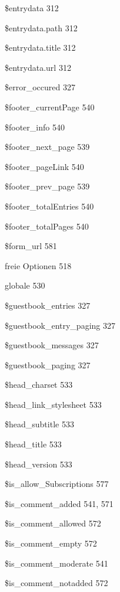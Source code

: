 \documentclass{book}
\renewcommand\subitem{\par}
\begin{document}
\begin{multicols}{2}
\begin{osp-index}
    \subitem \$entrydata\hspace{1mm} 312
    \subitem \$entrydata.path\hspace{1mm} 312
    \subitem \$entrydata.title\hspace{1mm} 312
    \subitem \$entrydata.url\hspace{1mm} 312
    \subitem \$error\_occured\hspace{1mm} 327
    \subitem \$footer\_currentPage\hspace{1mm} 540
    \subitem \$footer\_info\hspace{1mm} 540
    \subitem \$footer\_next\_page\hspace{1mm} 539
    \subitem \$footer\_pageLink\hspace{1mm} 540
    \subitem \$footer\_prev\_page\hspace{1mm} 539
    \subitem \$footer\_totalEntries\hspace{1mm} 540
    \subitem \$footer\_totalPages\hspace{1mm} 540
    \subitem \$form\_url\hspace{1mm} 581
    \subitem freie Optionen\hspace{1mm} 518
    \subitem globale\hspace{1mm} 530
    \subitem \$guestbook\_entries\hspace{1mm} 327
    \subitem \$guestbook\_entry\_paging\hspace{1mm} 327
    \subitem \$guestbook\_messages\hspace{1mm} 327
    \subitem \$guestbook\_paging\hspace{1mm} 327
    \subitem \$head\_charset\hspace{1mm} 533
    \subitem \$head\_link\_stylesheet\hspace{1mm} 533
    \subitem \$head\_subtitle\hspace{1mm} 533
    \subitem \$head\_title\hspace{1mm} 533
    \subitem \$head\_version\hspace{1mm} 533
    \subitem \$is\_allow\_Subscriptions\hspace{1mm} 577
    \subitem \$is\_comment\_added\hspace{1mm} 541, 571
    \subitem \$is\_comment\_allowed\hspace{1mm} 572
    \subitem \$is\_comment\_empty\hspace{1mm} 572
    \subitem \$is\_comment\_moderate\hspace{1mm} 541
    \subitem \$is\_comment\_notadded\hspace{1mm} 572

\end{osp-index}
\end{multicols}
\end{document}
